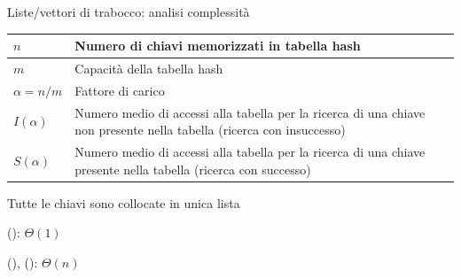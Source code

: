 \begin{frame}{Liste/vettori di trabocco: analisi complessità}
	
{\renewcommand*{\arraystretch}{1.3}
\begin{tabular}{|P{1.7cm}|P{9.5cm}|}
\hline
$n$ & Numero di chiavi memorizzati in tabella hash \\ \hline
$m$ & Capacità della tabella hash \\ \hline
$\alpha = n/m$ & Fattore di carico \\ \hline
$I(\alpha)$ & Numero medio di accessi alla tabella per
la ricerca di una chiave non presente nella tabella (\alert{ricerca con insuccesso}) \\ \hline
$S(\alpha)$ & Numero medio di accessi alla tabella per
la ricerca di una chiave presente nella tabella 
(\alert{ricerca con successo}) \\ \hline
\end{tabular}
}

\pause
\BI
\item Tutte le chiavi sono collocate in unica lista
\item \alert{\dictinsert()}: $\Theta(1)$
\item \alert{\dictlookup()}, \alert{\dictremove()}: $\Theta(n)$
\EI
	
\end{frame}

